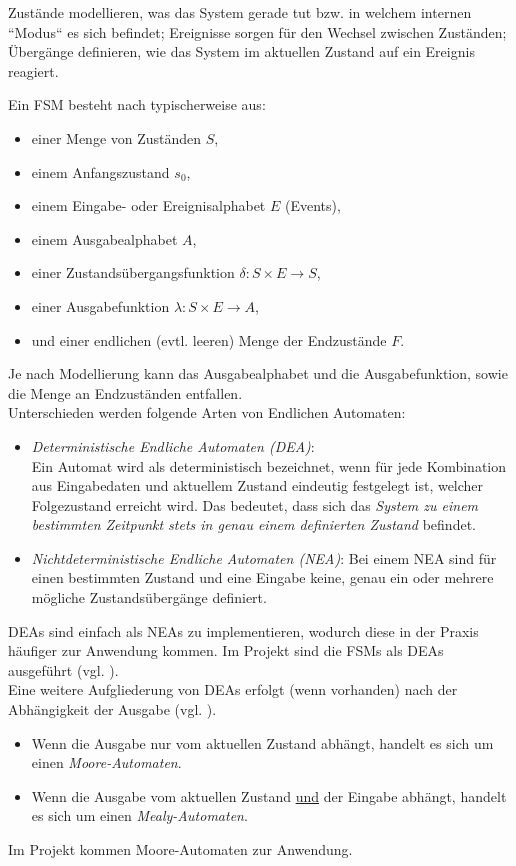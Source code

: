 \documentclass[a4paper, portrait, 12pt]{scrartcl} %
\begin{document}
Zustände modellieren, was das System gerade tut bzw. in welchem internen ``Modus`` es sich befindet; Ereignisse sorgen für den Wechsel zwischen Zuständen; Übergänge definieren, wie das System im aktuellen Zustand auf ein Ereignis reagiert.

Ein FSM besteht nach \cite[S. 7ff]{Baesig2019} typischerweise aus:
\begin{itemize}
	\item einer Menge von Zuständen $S$,
	\item einem Anfangszustand $s_0$,
	\item einem Eingabe- oder Ereignisalphabet $E$ (Events),
	\item einem Ausgabealphabet $A$,
	\item einer Zustandsübergangsfunktion $\delta :S\times E\rightarrow S$,
	\item einer Ausgabefunktion $\lambda :S\times E\rightarrow A$,
	\item und einer endlichen (evtl. leeren) Menge der Endzustände $F$.
\end{itemize}

Je nach Modellierung kann das Ausgabealphabet und die Ausgabefunktion, sowie die Menge an Endzuständen entfallen.\\

Unterschieden werden folgende Arten von Endlichen Automaten:
\begin{itemize}
	\item \emph{Deterministische Endliche Automaten (DEA)}:\\
	Ein Automat wird als deterministisch bezeichnet, wenn für jede Kombination aus Eingabedaten und aktuellem Zustand eindeutig festgelegt ist, welcher Folgezustand erreicht wird. Das bedeutet, dass sich das \emph{System zu einem bestimmten Zeitpunkt stets in genau einem definierten Zustand} befindet.
	\item \emph{Nichtdeterministische Endliche Automaten (NEA)}: Bei einem NEA sind für einen bestimmten Zustand und eine Eingabe keine, genau ein oder mehrere mögliche Zustandsübergänge definiert.
\end{itemize}

DEAs sind einfach als NEAs zu implementieren, wodurch diese in der Praxis häufiger zur Anwendung kommen. Im Projekt sind die FSMs als DEAs ausgeführt (vgl. \cite[S. 14]{Baesig2019}).\\

Eine weitere Aufgliederung von DEAs erfolgt (wenn vorhanden) nach der Abhängigkeit der Ausgabe (vgl. \cite[S. 8f]{Baesig2019}).
\begin{itemize}
	\item Wenn die Ausgabe nur vom aktuellen Zustand abhängt, handelt es sich um einen \emph{Moore-Automaten}.
	\item Wenn die Ausgabe vom aktuellen Zustand \underline{und} der Eingabe abhängt, handelt es sich um einen \emph{Mealy-Automaten}.
\end{itemize}
Im Projekt kommen Moore-Automaten zur Anwendung.
\end{document}
